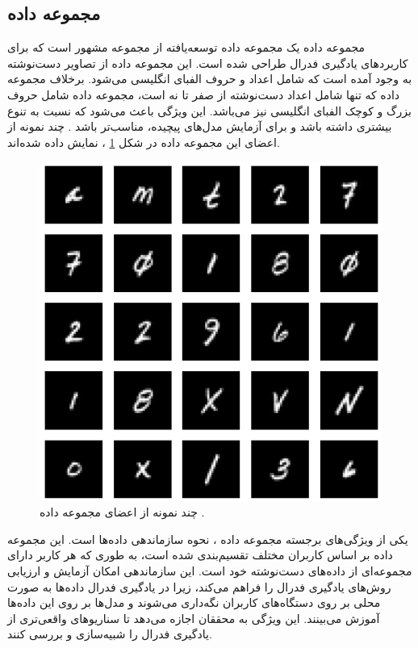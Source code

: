 \subsection{
	مجموعه داده
}
مجموعه داده
یک مجموعه داده توسعه‌یافته از مجموعه مشهور
است که برای کاربردهای یادگیری فدرال طراحی شده است. این مجموعه داده از تصاویر دست‌نوشته به وجود آمده است که شامل اعداد و حروف الفبای انگلیسی می‌شود. برخلاف مجموعه داده
که تنها شامل اعداد دست‌نوشته از صفر تا نه است، مجموعه داده
شامل حروف بزرگ و کوچک الفبای انگلیسی نیز می‌باشد. این ویژگی باعث می‌شود که
نسبت به
تنوع بیشتری داشته باشد و برای آزمایش مدل‌های پیچیده‌، مناسب‌تر باشد
\cite{caldas2018leaf}.
چند نمونه از اعضای این مجموعه داده در شکل
\ref{femnist}%
، نمایش داده شده‌اند.


\begin{figure}[t]
	\centering
	\includegraphics[scale=0.6]{images/chap5/femnist.png}%
	\caption{%
		چند نمونه از اعضای مجموعه داده
		\cite{holzer2023dynamically}.
	}
	\label{femnist}
	\centering
\end{figure}


یکی از ویژگی‌های برجسته مجموعه داده
،
نحوه سازماندهی داده‌ها است. این مجموعه داده بر اساس کاربران مختلف تقسیم‌بندی شده است، به طوری که هر کاربر دارای مجموعه‌ای از داده‌های دست‌نوشته خود است. این سازماندهی امکان آزمایش و ارزیابی روش‌های یادگیری فدرال را فراهم می‌کند، زیرا در یادگیری فدرال داده‌ها به صورت محلی بر روی دستگاه‌های کاربران نگه‌داری می‌شوند و مدل‌ها بر روی این داده‌ها آموزش می‌بینند. این ویژگی به محققان اجازه می‌دهد تا سناریوهای واقعی‌تری از یادگیری فدرال را شبیه‌سازی و بررسی کنند.

